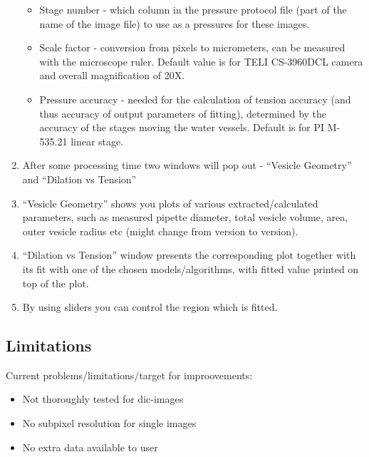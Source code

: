 \begin{enumerate}
\begin{itemize}
		\item Stage number - which column in the pressure protocol file (part of the name of the image file) to use as a pressures for these images.
		\item Scale factor - conversion from pixels to micrometers, can be measured with the microscope ruler. Default value is for TELI CS-3960DCL camera and overall magnification of 20X.
		\item Pressure accuracy - needed for the calculation of tension accuracy (and thus accuracy of output parameters of fitting), determined by the accuracy of the stages moving the water vessels. Default is for PI M-535.21 linear stage.
	\end{itemize}
	\item After some processing time two windows will pop out - ``Vesicle Geometry'' and ``Dilation vs Tension''
	\item ``Vesicle Geometry'' shows you plots of various extracted/calculated parameters, such as measured pipette diameter, total vesicle volume, area, outer vesicle radius etc (might change from version to version).
	\item ``Dilation vs Tension'' window presents the corresponding plot together with its fit with one of the chosen models/algorithms, with fitted value printed on top of the plot.
	\item By using sliders you can control the region which is fitted.
\end{enumerate}

\subsection{Limitations}\label{vampy-limits}
Current problems/limitations/target for improovements:
\begin{itemize}
	\item Not thoroughly tested for dic-images
	\item No subpixel resolution for single images
	\item No extra data available to user
\end{itemize}

